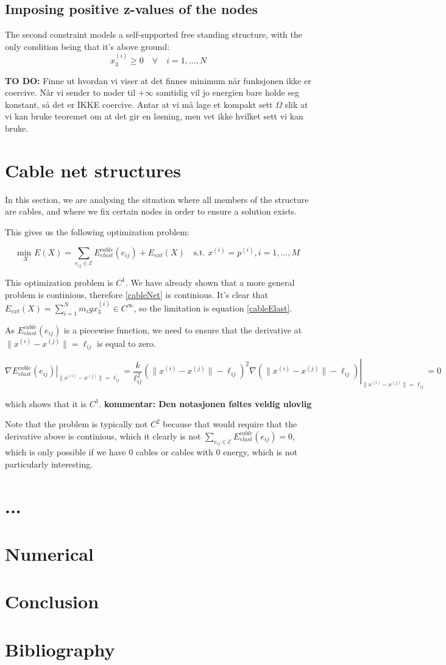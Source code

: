 \documentclass[11pt]{article}
\newcommand{\el}{\ell_{ij}}
\newcommand{\xnorm}{\lVert x^{(i)} - x^{(j)}\rVert}
\newcommand{\sumset}[1]{\sum\limits_{e_{ij} \in \mathcal{#1}}}
\newcommand{\ece}{E^{cable}_{elast}(e_{ij})}
\newcommand{\ee}{E_{ext}(X)}
\newcommand\at[2]{\left.#1\right|_{#2}}
\begin{document}
\subsection{Imposing positive z-values of the nodes}
The second constraint models a self-supported free standing structure, with the only condition being that it's above ground:
\begin{equation}
    x_3^{(i)} \geq 0 \quad \forall \quad i = 1,...,N
\end{equation}

\textbf{TO DO:}
Finne ut hvordan vi viser at det finnes minimum når funksjonen ikke er coercive. Når vi sender to noder til $+\infty$ samtidig vil jo energien bare holde seg konstant, så det er IKKE coercive. Antar at vi må lage et kompakt sett $\Omega$ slik at vi kan bruke teoremet om at det gir en løsning, men vet ikke hvilket sett vi kan bruke.
\section{Cable net structures}
In this section, we are analysing the situation where all members of the structure are cables, and where we fix certain nodes in order to ensure a solution exists. 

This gives us the following optimization problem:

\begin{equation}
    \underset{X}{\text{min }} E(X) = \sumset{E} \ece + \ee \quad \text{s.t. } x^{(i)} = p^{(i)}, i = 1,...,M
    \label{cableNet}
\end{equation}

This optimization problem is $C^1$. We have already shown that a more general problem is continious, therefore \eqref{cableNet} is continious. It's clear that $\ee = \sum_{i=1}^N m_i g x_3^{(i)} \in C^{\infty}$, so the limitation is equation \eqref{cableElast}.

As $\ece$ is a piecewise function, we need to ensure that the derivative at $\xnorm = \el$ is equal to zero.

\begin{equation}
    \at{\nabla \ece}{\xnorm = \el} = \at{ \frac{k}{\el^2}(\xnorm - \el)^2 \nabla (\xnorm-\el) }{\xnorm = \el} = 0
\end{equation}

which shows that it is $C^1$.
\textbf{kommentar: Den notasjonen føltes veldig ulovlig}

Note that the problem is typically not $C^2$ because that would require that the derivative above is continious, which it clearly is not
$\sumset{E} \ece = 0$, which is only possible if we have $0$ cables or cables with $0$ energy, which is not particularly interesting. 

\section{...}
\section{Numerical}
\section{Conclusion}
\section{Bibliography}
\end{document}
